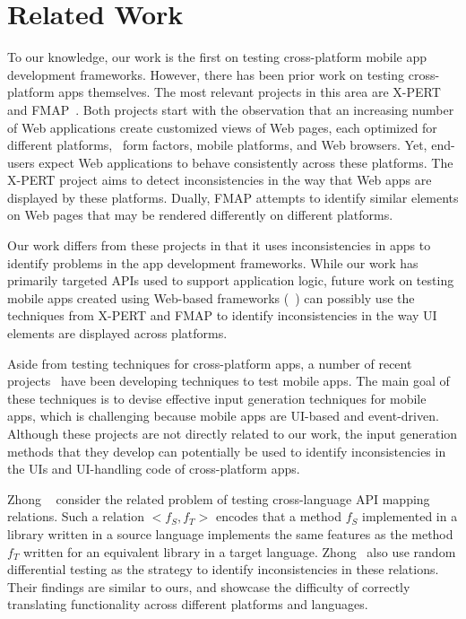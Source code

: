 \section{Related Work}
\label{section:related}

%
To our knowledge, our work is the first on testing cross-platform mobile app
development frameworks. However, there has been prior work on testing
cross-platform apps themselves. The most relevant projects in this area are
X-PERT~\cite{xpert:icse13} and FMAP~\cite{fmap:issta14}. Both projects start
with the observation that an increasing number of Web applications create
customized views of Web pages, each optimized for different platforms, \eg~form
factors, mobile platforms, and Web browsers. Yet, end-users expect Web
applications to behave consistently across these platforms.  The X-PERT project
aims to detect inconsistencies in the way that Web apps are displayed by these
platforms. Dually, FMAP attempts to identify similar elements on Web pages that
may be rendered differently on different platforms.

Our work differs from these projects in that it uses inconsistencies in apps to
identify problems in the app development frameworks. While our work has
primarily targeted APIs used to support application logic, future work on
testing mobile apps created using Web-based frameworks
(\eg~\cite{phonegap,sencha,worklight}) can possibly use the techniques from
X-PERT and FMAP to identify inconsistencies in the way UI elements are
displayed across platforms.

Aside from testing techniques for cross-platform apps, a number of recent
projects~\cite{dynodroid:fse13,concolicandroid:fse12,eventbreak:oopsla14,azim:oopsla13,memon:ase07,guitar:memon}
have been developing techniques to test mobile apps. The main goal of these
techniques is to devise effective input generation techniques for mobile apps,
which is challenging because mobile apps are UI-based and event-driven.
Although these projects are not directly related to our work, the input
generation methods that they develop can potentially be used to identify
inconsistencies in the UIs and UI-handling code of cross-platform apps.

Zhong \etal~\cite{zhong:fase13} consider the related problem of testing
cross-language API mapping relations. Such a relation $<f_S, f_T>$ encodes that
a method $f_S$ implemented in a library written in a source language implements
the same features as the method $f_T$ written for an equivalent library in a
target language. Zhong \etal\ also use random differential testing as the
strategy to identify inconsistencies in these relations. Their findings are
similar to ours, and showcase the difficulty of correctly translating
functionality across different platforms and languages.

